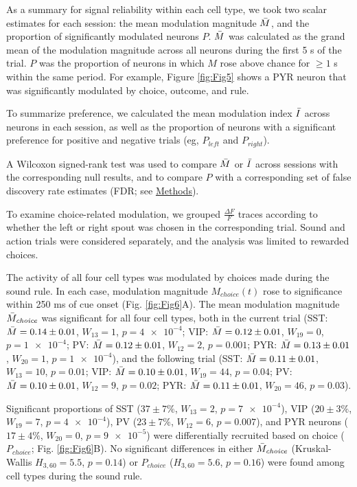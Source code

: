 As a summary for signal reliability within each cell type, we took two scalar estimates for each session: the mean modulation magnitude $\Bar{M}$, and the proportion of significantly modulated neurons $P$. $\Bar{M}$ was calculated as the grand mean of the modulation magnitude across all neurons during the first 5 s of the trial. $P$ was the proportion of neurons in which ${M}$ rose above chance for $\ge 1$ s within the same period. For example, Figure \ref{fig:Fig5} shows a PYR neuron that was significantly modulated by choice, outcome, and rule.

To summarize preference, we calculated the mean modulation index $\Bar{I}$ across neurons in each session, as well as the proportion of neurons with a significant preference for positive and negative trials (eg, $P_{\mathit{left}}$ and $P_{\mathit{right}}$). 

A Wilcoxon signed-rank test was used to compare $\Bar{M}$ or $\Bar{I}$ across sessions with the corresponding null results, and to compare $P$ with a corresponding set of false discovery rate estimates (FDR; see \hyperlink{methods_ROC}{Methods}). 


To examine choice-related modulation, we grouped $\frac{\Delta F}{F}$ traces according to whether the left or right spout was chosen in the corresponding trial. Sound and action trials were considered separately, and the analysis was limited to rewarded choices. 

The activity of all four cell types was modulated by choices made during the sound rule. In each case, modulation magnitude ${M}_{choice}(t)$ rose to significance within 250 ms of cue onset (Fig. \ref{fig:Fig6}A). The mean modulation magnitude $\Bar{M}_{\mathit{choice}}$ was significant for all four cell types, both in the current trial (SST: $\Bar{M}=0.14\pm0.01$, $W_{13}=1$, $p=\num{4e-4}$; VIP: $\Bar{M}=0.12\pm0.01$, $W_{19}=0$, $p=\num{1e-4}$; PV: $\Bar{M}=0.12\pm0.01$, $W_{12}=2$, $p=\num{0.001}$; PYR: $\Bar{M}=0.13\pm0.01$, $W_{20}=1$, $p=\num{1e-4}$), and the following trial (SST: $\Bar{M}=0.11\pm0.01$, $W_{13}=10$, $p=\num{0.01}$; VIP: $\Bar{M}=0.10\pm0.01$, $W_{19}=44$, $p=\num{0.04}$; PV: $\Bar{M}=0.10\pm0.01$, $W_{12}=9$, $p=\num{0.02}$; PYR: $\Bar{M}=0.11\pm0.01$, $W_{20}=46$, $p=\num{0.03}$).



Significant proportions of SST ($37\pm7\%$, $W_{13}=2$, $p=\num{7e-4}$), VIP ($20\pm3\%$, $W_{19}=7$, $p=\num{4e-4}$), PV ($23\pm7\%$, $W_{12}=6$, $p=\num{0.007}$), and PYR neurons ($17\pm4\%$, $W_{20}=0$, $p=\num{9e-5}$) were differentially recruited based on choice ($P_{\mathit{choice}}$; Fig. \ref{fig:Fig6}B). No significant differences in either $\Bar{M}_{\mathit{choice}}$ (Kruskal-Wallis $H_{3,60}=5.5$, $p=0.14$) or $P_{\mathit{choice}}$ ($H_{3,60}=5.6$, $p=0.16$) were found among cell types during the sound rule.


